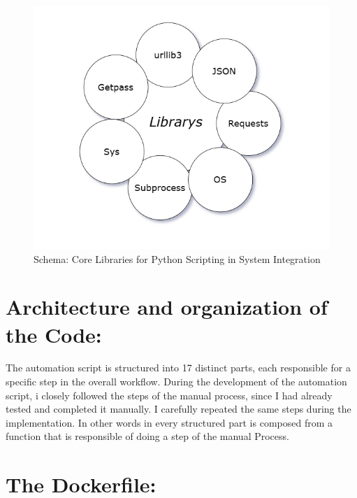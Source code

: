 \begin{figure}
    \centering
    \includegraphics[width=0.7\linewidth]{en/content/lp.png}
    \caption{Schema: Core Libraries for Python Scripting in System Integration }
    \label{fig:enter-label}
\end{figure}


\section{Architecture and organization of the Code:}
 The automation script is structured into 17 distinct parts, each responsible for a specific step in the overall workflow.
 During the development of the automation script, i closely followed the steps of the manual process, since I had already tested and completed it manually. I carefully repeated the same steps during the implementation. In other words in every structured part is composed from a function that is responsible of doing a step of the manual Process.
 
 \section{The Dockerfile:}
 

